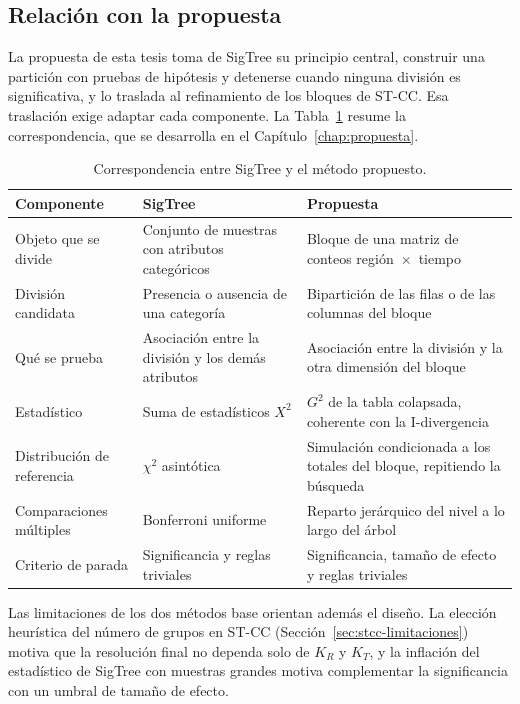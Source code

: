 \subsection{Relación con la propuesta}\label{sec:sigtree-propuesta}

La propuesta de esta tesis toma de SigTree su principio central, construir una
partición con pruebas de hipótesis y detenerse cuando ninguna división es
significativa, y lo traslada al refinamiento de los bloques de ST-CC. Esa
traslación exige adaptar cada componente. La Tabla~\ref{tab:sigtree-astcc} resume
la correspondencia, que se desarrolla en el Capítulo~\ref{chap:propuesta}.

\begin{table}[ht]
  \centering
  {\footnotesize
  \begin{tabular}{@{}>{\raggedright\arraybackslash}p{}
                  >{\raggedright\arraybackslash}p{}
                  >{\raggedright\arraybackslash}p{}@{}}
    \toprule
    \textbf{Componente} & \textbf{SigTree} & \textbf{Propuesta} \\
    \midrule
    Objeto que se divide & Conjunto de muestras con atributos categóricos &
      Bloque de una matriz de conteos región~$\times$~tiempo \\
    División candidata & Presencia o ausencia de una categoría &
      Bipartición de las filas o de las columnas del bloque \\
    Qué se prueba & Asociación entre la división y los demás atributos &
      Asociación entre la división y la otra dimensión del bloque \\
    Estadístico & Suma de estadísticos $X^2$ & $G^2$ de la tabla colapsada,
      coherente con la I-divergencia \\
    Distribución de referencia & $\chi^2$ asintótica & Simulación condicionada a
      los totales del bloque, repitiendo la búsqueda \\
    Comparaciones múltiples & Bonferroni uniforme & Reparto jerárquico del nivel
      a lo largo del árbol \\
    Criterio de parada & Significancia y reglas triviales & Significancia, tamaño
      de efecto y reglas triviales \\
    \bottomrule
  \end{tabular}
  }
  \caption{Correspondencia entre SigTree \cite{Hu2025} y el método propuesto.}
  \label{tab:sigtree-astcc}
\end{table}

Las limitaciones de los dos métodos base orientan además el diseño. La elección
heurística del número de grupos en ST-CC (Sección~\ref{sec:stcc-limitaciones})
motiva que la resolución final no dependa solo de $K_R$ y $K_T$, y la inflación
del estadístico de SigTree con muestras grandes motiva complementar la
significancia con un umbral de tamaño de efecto.
